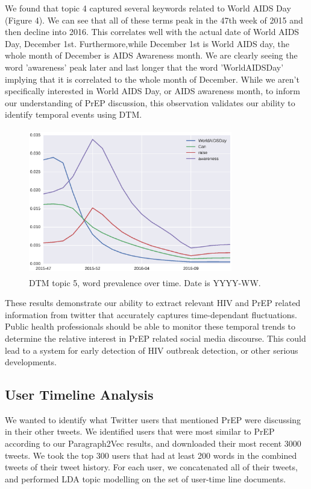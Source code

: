 \documentclass{sig-alternate-05-2015}
\begin{document}
We found that topic 4 captured several keywords related to World AIDS Day (Figure 4). We can see that all of these terms peak in the 47th week of 2015 and then decline into 2016. This correlates well with the actual date of World AIDS Day, December 1st. Furthermore,while December 1st is World AIDS day, the whole month of December is AIDS Awareness month. We are clearly seeing the word 'awareness' peak later and last longer that the word 'WorldAIDSDay' implying that it is correlated to the whole month of December. While we aren't specifically interested in World AIDS Day, or AIDS awareness month, to inform our understanding of PrEP discussion, this observation validates our ability to identify temporal events using DTM. 

\begin{figure}
\centering
\includegraphics[height=2.5in, width=3.5in]{DTMfig2}
\caption{DTM topic 5, word prevalence over time. Date is YYYY-WW.}
\end{figure}

These results demonstrate our ability to extract relevant HIV and PrEP related information from twitter that accurately captures time-dependant fluctuations. Public health professionals should be able to monitor these temporal trends to determine the relative interest in PrEP related social media discourse. This could lead to a system for early detection of HIV outbreak detection, or other serious developments.

\subsection{User Timeline Analysis}


We wanted to identify what Twitter users that mentioned PrEP were discussing in their other tweets. We identified users that were most similar to PrEP according to our Paragraph2Vec results, and downloaded their most recent 3000 tweets. We took the top 300 users that had at least 200 words in the combined tweets of their tweet history. For each user, we concatenated all of their tweets, and performed LDA topic modelling on the set of user-time line documents.
\end{document}
